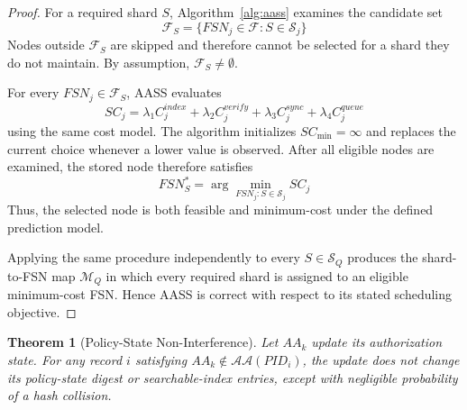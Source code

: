 \documentclass{ieeetj}
\theoremstyle{ieee-style}
\newtheorem{theorem}{Theorem}[subsection]
\begin{document}
\begin{proof}
For a required shard $S$, Algorithm~\ref{alg:aass} examines the candidate
set
\begin{equation}
\mathcal{F}_S=
\{FSN_j\in\mathcal{F}:S\in\mathcal{S}_j\}
\end{equation}
Nodes outside $\mathcal{F}_S$ are skipped and therefore cannot be selected
for a shard they do not maintain. By assumption,
$\mathcal{F}_S\neq\emptyset$.

For every $FSN_j\in\mathcal{F}_S$, AASS evaluates
\begin{equation}
SC_j=
\lambda_1C_j^{index}
+\lambda_2C_j^{verify}
+\lambda_3C_j^{sync}
+\lambda_4C_j^{queue}
\end{equation}
using the same cost model. The algorithm initializes
$SC_{\min}=\infty$ and replaces the current choice whenever a lower value
is observed. After all eligible nodes are examined, the stored node
therefore satisfies
\begin{equation}
FSN_S^*
=
\arg\min_{FSN_j:S\in\mathcal{S}_j}SC_j
\end{equation}
Thus, the selected node is both feasible and minimum-cost under the
defined prediction model.

Applying the same procedure independently to every
$S\in\mathcal{S}_Q$ produces the shard-to-FSN map $\mathcal{M}_Q$ in
which every required shard is assigned to an eligible minimum-cost FSN.
Hence AASS is correct with respect to its stated scheduling objective.
\end{proof}


\begin{theorem}[Policy-State Non-Interference]
Let $AA_k$ update its authorization state. For any record $i$ satisfying
$AA_k\notin\mathcal{AA}(PID_i)$, the update does not change its
policy-state digest or searchable-index entries, except with negligible
probability of a hash collision.
\end{theorem}
\end{document}
